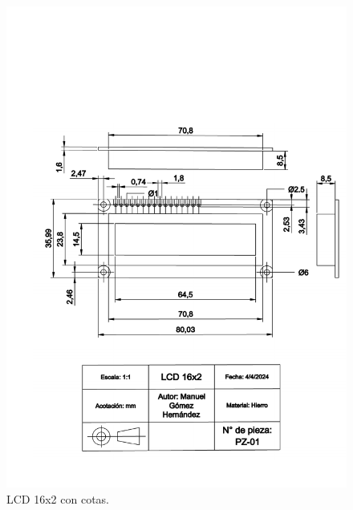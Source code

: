     \begin{figure}[H]
        \centering
        \includegraphics[scale=0.4]{15/img/lcdTrazo.pdf}
        \caption{LCD 16x2 con cotas.}
        \label{fig:lcdTrazo}
    \end{figure}
    
